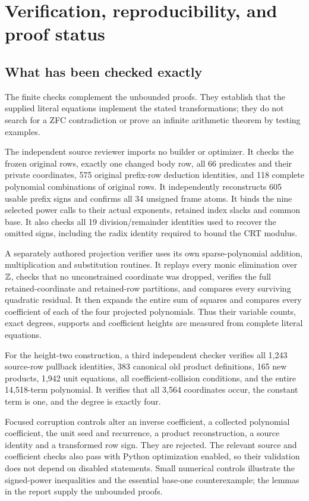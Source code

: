 \section{Verification, reproducibility, and proof status}
\subsection{What has been checked exactly}

The finite checks complement the unbounded proofs. They establish that the supplied literal equations implement the stated transformations; they do not search for a ZFC contradiction or prove an infinite arithmetic theorem by testing examples.

The independent source reviewer imports no builder or optimizer. It checks the frozen original rows, exactly one changed body row, all 66 predicates and their private coordinates, 575 original prefix-row deduction identities, and 118 complete polynomial combinations of original rows. It independently reconstructs 605 usable prefix signs and confirms all 34 unsigned frame atoms. It binds the nine selected power calls to their actual exponents, retained index slacks and common base. It also checks all 19 division/remainder identities used to recover the omitted signs, including the radix identity required to bound the CRT modulus.

A separately authored projection verifier uses its own sparse-polynomial addition, multiplication and substitution routines. It replays every monic elimination over \(\mathbb Z\), checks that no unconstrained coordinate was dropped, verifies the full retained-coordinate and retained-row partitions, and compares every surviving quadratic residual. It then expands the entire sum of squares and compares every coefficient of each of the four projected polynomials. Thus their variable counts, exact degrees, supports and coefficient heights are measured from complete literal equations.

For the height-two construction, a third independent checker verifies all 1,243 source-row pullback identities, 383 canonical old product definitions, 165 new products, 1,942 unit equations, all coefficient-collision conditions, and the entire 14,518-term polynomial. It verifies that all 3,564 coordinates occur, the constant term is one, and the degree is exactly four.

Focused corruption controls alter an inverse coefficient, a collected polynomial coefficient, the unit seed and recurrence, a product reconstruction, a source identity and a transformed row sign. They are rejected. The relevant source and coefficient checks also pass with Python optimization enabled, so their validation does not depend on disabled  statements. Small numerical controls illustrate the signed-power inequalities and the essential base-one counterexample; the lemmas in the report supply the unbounded proofs.

